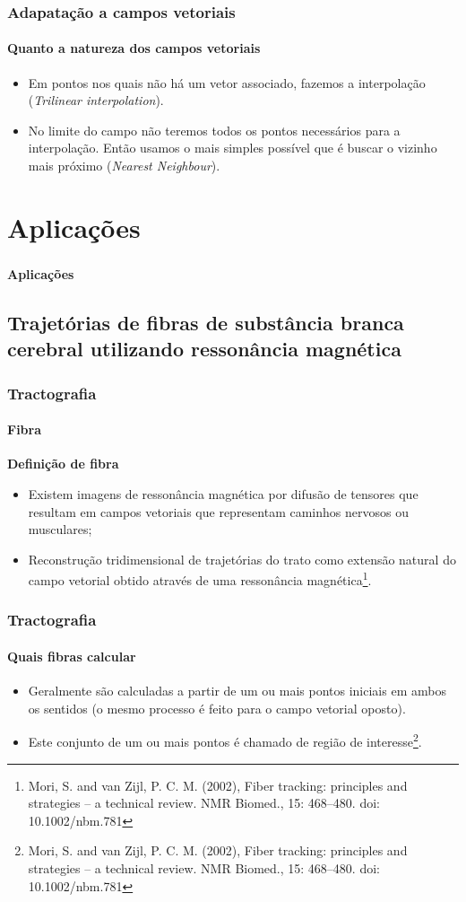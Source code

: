 \documentclass[brazil, 10pt]{beamer}
\begin{document}
\begin{frame}
  \frametitle{Adapatação a campos vetoriais}
  \framesubtitle{Quanto a natureza dos campos vetoriais}

  \begin{itemize}
    \item Em pontos nos quais não há um vetor associado, fazemos a interpolação (\textit{Trilinear interpolation}).
    \item No limite do campo não teremos todos os pontos necessários para a interpolação. Então usamos o mais simples possível que é buscar o vizinho mais próximo (\textit{Nearest Neighbour}).
  \end{itemize}
\end{frame}

\section{Aplicações}
\begin{frame}
  \frametitle{}
  \framesubtitle{}
  \begin{Large}
  \begin{center}
  \textbf{Aplicações}
  \end{center}
  \end{Large}
\end{frame}

\subsection{Trajetórias de fibras de substância branca cerebral utilizando ressonância magnética}
\begin{frame}
  \frametitle{Tractografia}
  \framesubtitle{Fibra}
  \textbf{Definição de fibra}
  \begin{itemize}
    \item Existem imagens de ressonância magnética por difusão de tensores que resultam em campos vetoriais que representam caminhos nervosos ou musculares;
    \item Reconstrução tridimensional de trajetórias do trato como extensão natural do campo vetorial obtido através de uma ressonância magnética\footnote{Mori, S. and van Zijl, P. C. M. (2002), Fiber tracking: principles and strategies – a technical review. NMR Biomed., 15: 468–480. doi: 10.1002/nbm.781}.
  \end{itemize}
  
\end{frame}

\begin{frame}
  \frametitle{Tractografia}
  \framesubtitle{Quais fibras calcular}
  \begin{itemize}
    \item Geralmente são calculadas a partir de um ou mais pontos iniciais em ambos os sentidos (o mesmo processo é feito para o campo vetorial oposto).
    \item Este conjunto de um ou mais pontos é chamado de região de interesse\footnote{Mori, S. and van Zijl, P. C. M. (2002), Fiber tracking: principles and strategies – a technical review. NMR Biomed., 15: 468–480. doi: 10.1002/nbm.781}.
  \end{itemize}
\end{frame}
\end{document}
